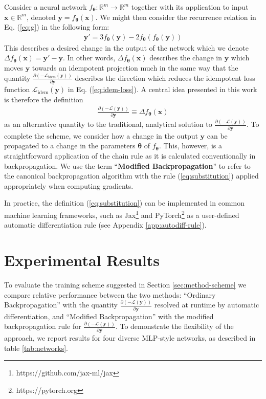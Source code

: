 \documentclass{article}
\theoremstyle{plain}
\theoremstyle{definition}
\theoremstyle{remark}
\newcommand{\vx}{\mathbf{x}}
\newcommand{\vy}{\mathbf{y}}
\newcommand{\vtheta}{\bm{\theta}}
\newcommand{\pd}[2]{\frac{\partial{#1}}{\partial{#2}}}
\begin{document}
Consider a neural network ${f_{\vtheta}: \mathbb{R}^m \to \mathbb{R}^m}$ together with its application to input ${\vx \in \mathbb{R}^m}$, denoted ${\vy = f_{\vtheta}(\vx)}$. We might then consider the recurrence relation in Eq. (\ref{eq:g}) in the following form:
%
\begin{align}
    \vy' = 3f_{\vtheta}(\vy) - 2f_{\vtheta}(f_{\vtheta}(\vy))
\end{align}
%
This describes a desired change in the output of the network which we denote ${\Delta f_{\vtheta}(\vx) = \vy' - \vy}$. In other words, ${\Delta f_{\vtheta}(\vx)}$ describes the change in $\vy$ which moves $\vy$ towards an idempotent projection much in the same way that the quantity $\pd{(-\mathcal{L}_{\mathrm{idem}}(\vy))}{\vy}$ describes the direction which reduces the idempotent loss function $\mathcal{L}_{\mathrm{idem}}(\vy)$ in Eq. (\ref{eq:idem-loss}). A central idea presented in this work is therefore the definition
%
\begin{align}
    \pd{(-\mathcal{L}(\vy))}{\vy} \equiv \Delta f_{\vtheta}(\vx)
    \label{eq:substitution}
\end{align}
%
as an alternative quantity to the traditional, analytical solution to $\pd{(-\mathcal{L}(\vy))}{\vy}$. To complete the scheme, we consider how a change in the output $\vy$ can be propagated to a change in the parameters $\vtheta$ of $f_{\vtheta}$. This, however, is a straightforward application of the chain rule as it is calculated conventionally in backpropagation. We use the term ``\textbf{Modified Backpropagation}'' to refer to the canonical backpropagation algorithm with the rule (\ref{eq:substitution}) applied appropriately when computing gradients.

In practice, the definition (\ref{eq:substitution}) can be implemented in common machine learning frameworks, such as Jax\footnote{https://github.com/jax-ml/jax} and PyTorch\footnote{https://pytorch.org} as a user-defined automatic differentiation rule (see Appendix \ref{app:autodiff-rule}).

\section{Experimental Results}
\label{sec:experiment}
To evaluate the training scheme suggested in Section \ref{sec:method-scheme} we compare relative performance between the two methods: ``Ordinary Backpropagation'' with the quantity $\pd{(-\mathcal{L}(\vy))}{\vy}$ resolved at runtime by automatic differentiation, and ``Modified Backpropagation'' with the modified backpropagation rule for $\pd{(-\mathcal{L}(\vy))}{\vy}$. To demonstrate the flexibility of the approach, we report results for four diverse MLP-style networks, as described in table \ref{tab:networks}.
\end{document}
